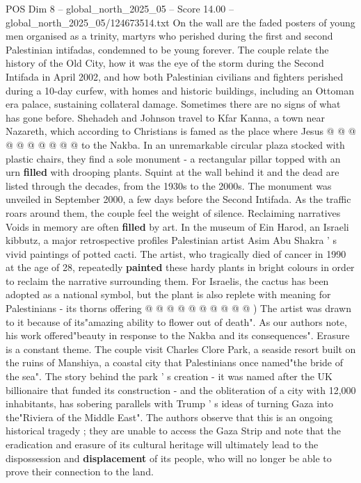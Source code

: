 \begin{textsample}{POS Dim 8 – global\_north\_2025\_05 – Score 14.00 – global\_north\_2025\_05/124673514.txt}
On the wall are the faded posters of young men organised as a trinity, martyrs who perished during the first and second Palestinian intifadas, condemned to be young forever.
The couple relate the history of the Old City, how it was the eye of the storm during the Second Intifada in April 2002, and how both Palestinian civilians and fighters perished during a 10-day curfew, with homes and historic buildings, including an Ottoman era palace, sustaining collateral damage.
Sometimes there are no signs of what has gone before.
Shehadeh and Johnson travel to Kfar Kanna, a town near Nazareth, which according to Christians is famed as the place where Jesus @ @ @ @ @ @ @ @ @ @ to the Nakba.
In an unremarkable circular plaza stocked with plastic chairs, they find a sole monument - a rectangular pillar topped with an urn \textbf{filled} with drooping plants.
Squint at the wall behind it and the dead are listed through the decades, from the 1930s to the 2000s.
The monument was unveiled in September 2000, a few days before the Second Intifada.
As the traffic roars around them, the couple feel the weight of silence.
Reclaiming narratives Voids in memory are often \textbf{filled} by art.
In the museum of Ein Harod, an Israeli kibbutz, a major retrospective profiles Palestinian artist Asim Abu Shakra ' s vivid paintings of potted cacti.
The artist, who tragically died of cancer in 1990 at the age of 28, repeatedly \textbf{painted} these hardy plants in bright colours in order to reclaim the narrative surrounding them.
For Israelis, the cactus has been adopted as a national symbol, but the plant is also replete with meaning for Palestinians - its thorns offering @ @ @ @ @ @ @ @ @ @ ) The artist was drawn to it because of its"amazing ability to flower out of death".
As our authors note, his work offered"beauty in response to the Nakba and its consequences".
Erasure is a constant theme.
The couple visit Charles Clore Park, a seaside resort built on the ruins of Manshiya, a coastal city that Palestinians once named"the bride of the sea".
The story behind the park ' s creation - it was named after the UK billionaire that funded its construction - and the obliteration of a city with 12,000 inhabitants, has sobering parallels with Trump ' s ideas of turning Gaza into the"Riviera of the Middle East".
The authors observe that this is an ongoing historical tragedy ; they are unable to access the Gaza Strip and note that the eradication and erasure of its cultural heritage will ultimately lead to the dispossession and \textbf{displacement} of its people, who will no longer be able to prove their connection to the land.

\end{textsample}
